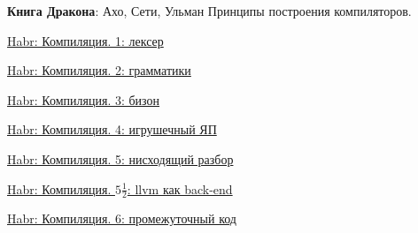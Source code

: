 % 
% 
% 


\label{lexlit}

\label{exdragon}\cite{dragonbook} \textbf{Книга Дракона}: Ахо, Сети, Ульман
Принципы построения компиляторов.

\bigskip

\href{http://habrahabr.ru/post/99162/}{Habr: Компиляция. 1: лексер}

\href{http://habrahabr.ru/post/99298/}{Habr: Компиляция. 2: грамматики}

\href{http://habrahabr.ru/post/99366/}{Habr: Компиляция. 3: бизон}

\href{http://habrahabr.ru/post/99397/}{Habr: Компиляция. 4: игрушечный ЯП}

\href{http://habrahabr.ru/post/99466/}{Habr: Компиляция. 5: нисходящий разбор}

\href{http://habrahabr.ru/post/102597/}{Habr: Компиляция. $5\frac{1}{2}$: llvm
как back-end}

\href{http://habrahabr.ru/post/99592/}{Habr: Компиляция. 6: промежуточный код}



\secup
